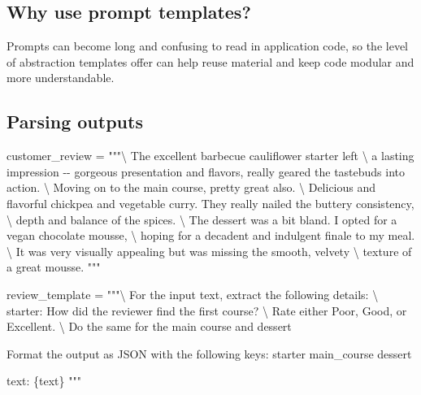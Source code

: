 \documentclass[
  letterpaper,
  DIV=11,
  numbers=noendperiod]{scrreprt}
\newenvironment{Shaded}{\begin{snugshade}}{\end{snugshade}}
\newcommand{\CharTok}[1]{\textcolor[rgb]{0.13,0.47,0.30}{#1}}
\newcommand{\NormalTok}[1]{\textcolor[rgb]{0.00,0.23,0.31}{#1}}
\newcommand{\OperatorTok}[1]{\textcolor[rgb]{0.37,0.37,0.37}{#1}}
\newcommand{\SpecialCharTok}[1]{\textcolor[rgb]{0.37,0.37,0.37}{#1}}
\newcommand{\StringTok}[1]{\textcolor[rgb]{0.13,0.47,0.30}{#1}}
\begin{document}
\hypertarget{why-use-prompt-templates}{%
\subsection{Why use prompt templates?}\label{why-use-prompt-templates}}

Prompts can become long and confusing to read in application code, so
the level of abstraction templates offer can help reuse material and
keep code modular and more understandable.

\hypertarget{parsing-outputs}{%
\subsection{Parsing outputs}\label{parsing-outputs}}

\begin{Shaded}
\begin{Highlighting}[]
\NormalTok{customer\_review }\OperatorTok{=} \StringTok{"""}\CharTok{\textbackslash{}}
\StringTok{The excellent barbecue cauliflower starter left }\CharTok{\textbackslash{}}
\StringTok{a lasting impression {-}{-} gorgeous presentation and flavors, really geared the tastebuds into action. }\CharTok{\textbackslash{}}
\StringTok{Moving on to the main course, pretty great also. }\CharTok{\textbackslash{}}
\StringTok{Delicious and flavorful chickpea and vegetable curry. They really nailed the buttery consistency, }\CharTok{\textbackslash{}}
\StringTok{depth and balance of the spices. }\CharTok{\textbackslash{}}
\StringTok{The dessert was a bit bland. I opted for a vegan chocolate mousse, }\CharTok{\textbackslash{}}
\StringTok{hoping for a decadent and indulgent finale to my meal. }\CharTok{\textbackslash{}}
\StringTok{It was very visually appealing but was missing the smooth, velvety }\CharTok{\textbackslash{}}
\StringTok{texture of a great mousse.}
\StringTok{"""}

\NormalTok{review\_template }\OperatorTok{=} \StringTok{"""}\CharTok{\textbackslash{}}
\StringTok{For the input text, extract the following details: }\CharTok{\textbackslash{}}
\StringTok{starter: How did the reviewer find the first course? }\CharTok{\textbackslash{}}
\StringTok{Rate either Poor, Good, or Excellent. }\CharTok{\textbackslash{}}
\StringTok{Do the same for the main course and dessert}

\StringTok{Format the output as JSON with the following keys:}
\StringTok{starter}
\StringTok{main\_course}
\StringTok{dessert}

\StringTok{text: }\SpecialCharTok{\{text\}}
\StringTok{"""}

\end{Highlighting}
\end{Shaded}
\end{document}
